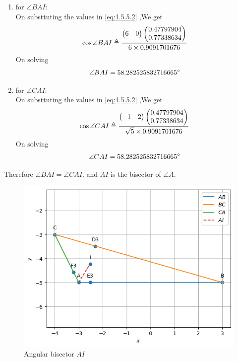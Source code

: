 \documentclass[11pt]{book}
\begin{document}
\begin{enumerate}[label=\thesection.\arabic*.,ref=\thesection.\theenumi]
\begin{enumerate}
    \item for $\angle BAI$: \\
    On substtuting the values in  \eqref{eq:1.5.5.2} ,We get 
    \begin{align}
        \cos{\angle BAI} \triangleq \frac{\begin{pmatrix} 6 & 0\end{pmatrix}\begin{pmatrix}0.47797904 \\ 0.77338634\end{pmatrix}}{ 6\times 0.9091701676} \\
    \end{align}
    On solving 
    \begin{align}
        \angle BAI = 58.282525832716665 \degree
    \end{align}
       \item for $\angle CAI$: \\
    On substtuting the values in  \eqref{eq:1.5.5.2} ,We get 
    \begin{align}
        \cos{\angle CAI} \triangleq \frac{\begin{pmatrix} -1 & 2\end{pmatrix}\begin{pmatrix}0.47797904 \\ 0.77338634\end{pmatrix}}{ \sqrt{5} \times 0.9091701676} \\
    \end{align}
    On solving 
    \begin{align}
        \angle CAI = 58.282525832716665 \degree
    \end{align}
\end{enumerate}
Therefore $\angle BAI = \angle CAI.$ and $AI$ is the bisector of $\angle A$. 
\begin{figure}[H]
    \centering
    \includegraphics{figs/Ang_bisect4.png}
    \caption{Angular bisector  $AI$}
    \label{fig:Ang_bisect4}
\end{figure}



\end{enumerate}
\end{document}
